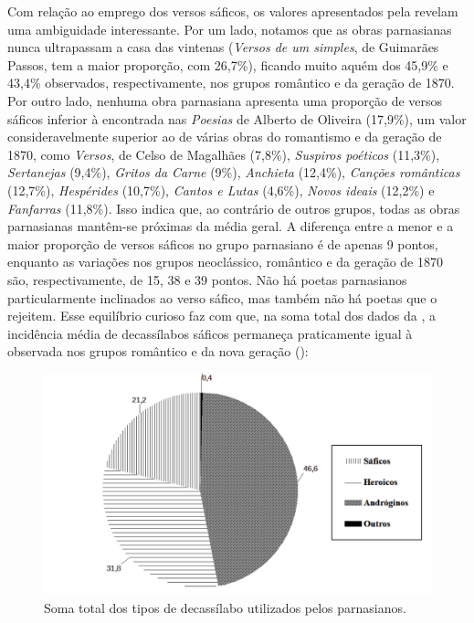 \documentclass[portuguese]{textolivre}
\begin{document}
Com relação ao emprego dos versos sáficos, os valores apresentados pela  revelam uma ambiguidade interessante. Por um lado, notamos que as obras parnasianas nunca ultrapassam a casa das vintenas (\textit{Versos de um simples}, de Guimarães Passos, tem a maior proporção, com 26,7\%), ficando muito aquém dos 45,9\% e 43,4\% observados, respectivamente, nos grupos romântico e da geração de 1870. Por outro lado, nenhuma obra parnasiana apresenta uma proporção de versos sáficos inferior à encontrada nas \textit{Poesias} de Alberto de Oliveira (17,9\%), um valor consideravelmente superior ao de várias obras do romantismo e da geração de 1870, como \textit{Versos}, de Celso de Magalhães (7,8\%), \textit{Suspiros poéticos} (11,3\%), \textit{Sertanejas} (9,4\%), \textit{Gritos da Carne} (9\%), \textit{Anchieta} (12,4\%), \textit{Canções românticas} (12,7\%), \textit{Hespérides} (10,7\%),\textit{ Cantos e Lutas} (4,6\%), \textit{Novos ideais} (12,2\%) e \textit{Fanfarras} (11,8\%). Isso indica que, ao contrário de outros grupos, todas as obras parnasianas mantêm-se próximas da média geral. A diferença entre a menor e a maior proporção de versos sáficos no grupo parnasiano é de apenas 9 pontos, enquanto as variações nos grupos neoclássico, romântico e da geração de 1870 são, respectivamente, de 15, 38 e 39 pontos. Não há poetas parnasianos particularmente inclinados ao verso sáfico, mas também não há poetas que o rejeitem. Esse equilíbrio curioso faz com que, na soma total dos dados da , a incidência média de decassílabos sáficos permaneça praticamente igual à observada nos grupos romântico e da nova geração ():

\begin{figure}
    \centering
    \begin{minipage}{0.75\linewidth}
    \includegraphics[width=\linewidth]{fig-005.pdf}
    \caption{Soma total dos tipos de decassílabo utilizados pelos parnasianos.}
    \label{fig5}
    \end{minipage}
\end{figure}
\end{document}
